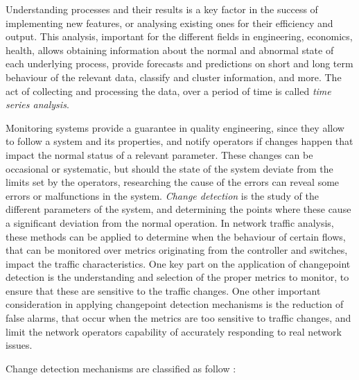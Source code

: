 Understanding processes and their results is a key factor in the success of implementing new features, or analysing existing ones for their efficiency and output. This analysis, important for the different fields in engineering,
economics, health, allows obtaining information about the normal and abnormal state of each underlying process, provide forecasts and predictions on short and long term behaviour of the relevant data, classify and cluster 
information, and more. The act of collecting and processing the data, over a period of time is called \textit{time series analysis}. 
\par Monitoring systems provide a guarantee in quality engineering, since they allow to follow a system and its properties, and notify operators if changes happen that impact the normal status of a relevant parameter. These changes
can be occasional or systematic, but should the state of the system deviate from the limits set by the operators, researching the cause of the errors can reveal some errors or malfunctions in the system. \textit{Change detection}
is the study of the different parameters of the system, and determining the points where these cause a significant deviation from the normal operation. In network traffic analysis, these methods can be applied to determine when 
the behaviour of certain flows, that can be monitored over metrics originating from the controller and switches, impact the traffic characteristics. One key part on the application of changepoint detection is the understanding 
and selection of the proper metrics to monitor, to ensure that these are sensitive to the traffic changes. One other important consideration in applying changepoint detection mechanisms is the reduction of false alarms, that occur 
when the metrics are too sensitive to traffic changes, and limit the network operators capability of accurately responding to real network issues. 
\par Change detection mechanisms are classified as follow  \cite{munz_traffic_2010}:

